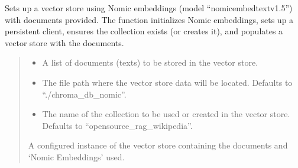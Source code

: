\documentclass[letterpaper,10pt,english,openany,oneside]{sphinxmanual}
\begin{document}

\begin{fulllineitems}
\label{\detokenize{data_storage:tools.pipeline.setup_vectorstore_nomic}}
\pysigstartsignatures
{}
\pysigstopsignatures
\sphinxAtStartPar
Sets up a vector store using Nomic embeddings (model “nomic\sphinxhyphen{}embed\sphinxhyphen{}text\sphinxhyphen{}v1.5”) with documents provided. 
The function initializes Nomic embeddings, sets up a persistent client, ensures the collection 
exists (or creates it),  and populates a vector store with the documents.
\begin{quote}\begin{description}
\begin{itemize}
\item {} 
\sphinxAtStartPar
{} \textendash{} A list of documents (texts) to be stored in the vector store.

\item {} 
\sphinxAtStartPar
{} \textendash{} The file path where the vector store data will be located. Defaults to “./chroma\_db\_nomic”.

\item {} 
\sphinxAtStartPar
{} \textendash{} The name of the collection to be used or created in the vector store.
Defaults to “opensource\_rag\_wikipedia”.

\end{itemize}

\sphinxAtStartPar
A configured instance of the  vector store containing the documents and ‘Nomic Embeddings’ used.

\end{description}\end{quote}

\end{fulllineitems}
\end{document}
